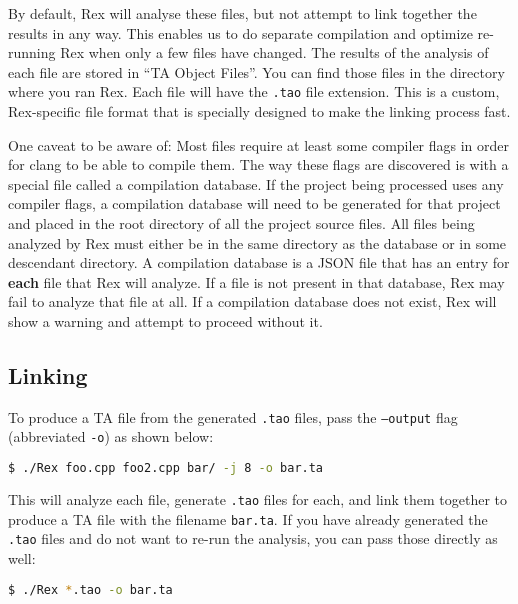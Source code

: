 \bigskip

By default, Rex will analyse these files, but not attempt to link together the
results in any way. This enables us to do separate compilation and optimize
re-running Rex when only a few files have changed. The results of the analysis
of each file are stored in ``TA Object Files''. You can find those files in the
directory where you ran Rex. Each file will have the \texttt{.tao} file
extension. This is a custom, Rex-specific file format that is specially designed
to make the linking process fast.

\bigskip

One caveat to be aware of: Most files require at least some compiler flags in
order for clang to be able to compile them. The way these flags are discovered
is with a special file called a compilation database. If the project being
processed uses any compiler flags, a compilation database will need to be
generated for that project and placed in the root directory of all the project
source files. All files being analyzed by Rex must either be in the same
directory as the database or in some descendant directory. A compilation
database is a JSON file that has an entry for \textbf{each} file that Rex will
analyze. If a file is not present in that database, Rex may fail to analyze that
file at all. If a compilation database does not exist, Rex will show a warning
and attempt to proceed without it.

\subsection{Linking}

To produce a TA file from the generated \texttt{.tao} files, pass the
\texttt{--output} flag (abbreviated \texttt{-o}) as shown below:

\begin{lstlisting}[language=bash]
	$ ./Rex foo.cpp foo2.cpp bar/ -j 8 -o bar.ta
\end{lstlisting}

\noindent This will analyze each file, generate \texttt{.tao} files for each,
and link them together to produce a TA file with the filename \texttt{bar.ta}.
If you have already generated  the \texttt{.tao} files and do not want to re-run
the analysis, you can pass those directly as well:

\begin{lstlisting}[language=bash]
	$ ./Rex *.tao -o bar.ta
\end{lstlisting}

